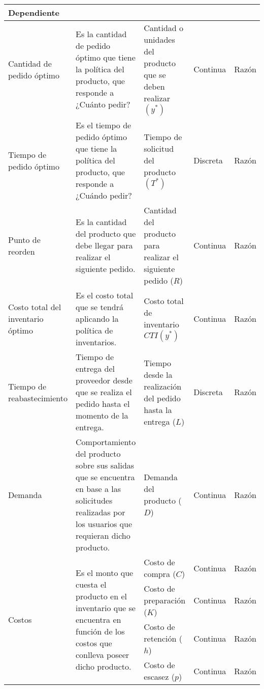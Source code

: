 \begin{landscape}
\begin{longtable}{p{3.5cm}p{6.5cm}p{5cm}p{3cm}p{2.5cm}}
    \multicolumn{5}{l}{\textbf{Dependiente}} \\
    \hline
    Cantidad de pedido óptimo & Es la cantidad de pedido óptimo que tiene la política del producto, que responde a ¿Cuánto pedir? \citep{taha2012investigacion} & Cantidad o unidades del producto que se deben realizar $(y^*)$ & Continua & Razón \\
    \hline
    Tiempo de pedido óptimo & Es el tiempo de pedido óptimo que tiene la política del producto, que responde a ¿Cuándo pedir? \citep{taha2012investigacion} & Tiempo de solicitud del producto $(T^*)$ & Discreta & Razón \\
    \hline
    Punto de reorden & Es la cantidad del producto que debe llegar para realizar el siguiente pedido. \citep{taha2012investigacion} & Cantidad del producto para realizar el siguiente pedido ($R$) & Continua & Razón \\
    \hline
    Costo total del inventario óptimo & Es el costo total que se tendrá aplicando la política de inventarios. \citep{taha2012investigacion} & Costo total de inventario $CTI(y^*)$ & Continua & Razón \\
    \hline
    Tiempo de reabastecimiento & Tiempo de entrega del proveedor desde que se realiza el pedido hasta el momento de la entrega. \citep{taha2012investigacion} & Tiempo desde la realización del pedido hasta la entrega ($L$) & Discreta & Razón \\
    \hline
    Demanda & Comportamiento del producto sobre sus salidas que se encuentra en base a las solicitudes realizadas por los usuarios que requieran dicho producto. \citep{hillier2003introduccion} & Demanda del producto ($D$) & Continua & Razón \\
    \hline
    \multirow{4}{*}{Costos} & \multirow{4}{6.5cm}{Es el monto que cuesta el producto en el inventario que se encuentra en función de los costos que conlleva poseer dicho producto. \citep{taha2012investigacion}} & Costo de compra ($C$) & Continua & Razón \\
    \cline{3-5}
    & & Costo de preparación ($K$) & Continua & Razón \\
    \cline{3-5}
    & & Costo de retención ($h$) & Continua & Razón \\
    \cline{3-5}
    & & Costo de escasez ($p$) & Continua & Razón \\
    \hline
\end{longtable}

\end{landscape} %




















